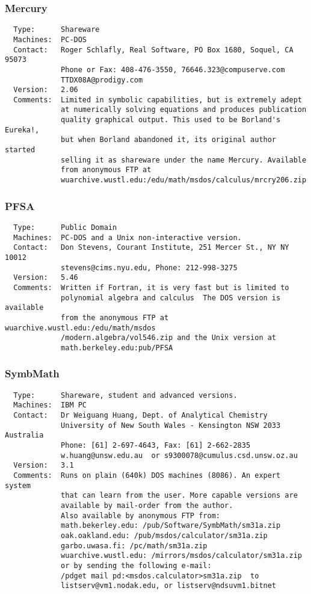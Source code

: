 \subsubsection{Mercury}
\begin{verbatim}
  Type:      Shareware
  Machines:  PC-DOS
  Contact:   Roger Schlafly, Real Software, PO Box 1680, Soquel, CA 95073
             Phone or Fax: 408-476-3550, 76646.323@compuserve.com
             TTDX08A@prodigy.com
  Version:   2.06
  Comments:  Limited in symbolic capabilities, but is extremely adept
             at numerically solving equations and produces publication
             quality graphical output. This used to be Borland's Eureka!,
             but when Borland abandoned it, its original author started
             selling it as shareware under the name Mercury. Available
             from anonymous FTP at
             wuarchive.wustl.edu:/edu/math/msdos/calculus/mrcry206.zip
\end{verbatim}

\subsubsection{PFSA}
\begin{verbatim}
  Type:      Public Domain
  Machines:  PC-DOS and a Unix non-interactive version.
  Contact:   Don Stevens, Courant Institute, 251 Mercer St., NY NY 10012
             stevens@cims.nyu.edu, Phone: 212-998-3275
  Version:   5.46
  Comments:  Written if Fortran, it is very fast but is limited to
             polynomial algebra and calculus  The DOS version is available
             from the anonymous FTP at wuarchive.wustl.edu:/edu/math/msdos
             /modern.algebra/vol546.zip and the Unix version at
             math.berkeley.edu:pub/PFSA
\end{verbatim}

\subsubsection{SymbMath}
\begin{verbatim}
  Type:      Shareware, student and advanced versions.
  Machines:  IBM PC
  Contact:   Dr Weiguang Huang, Dept. of Analytical Chemistry
             University of New South Wales - Kensington NSW 2033 Australia
             Phone: [61] 2-697-4643, Fax: [61] 2-662-2835
             w.huang@unsw.edu.au  or s9300078@cumulus.csd.unsw.oz.au
  Version:   3.1
  Comments:  Runs on plain (640k) DOS machines (8086). An expert system
             that can learn from the user. More capable versions are
             available by mail-order from the author.
             Also available by anonymous FTP from:
             math.bekerley.edu: /pub/Software/SymbMath/sm31a.zip
             oak.oakland.edu: /pub/msdos/calculator/sm31a.zip
             garbo.uwasa.fi: /pc/math/sm31a.zip
             wuarchive.wustl.edu: /mirrors/msdos/calculator/sm31a.zip
             or by sending the following e-mail:
             /pdget mail pd:<msdos.calculator>sm31a.zip  to
             listserv@vm1.nodak.edu, or listserv@ndsuvm1.bitnet
\end{verbatim}



